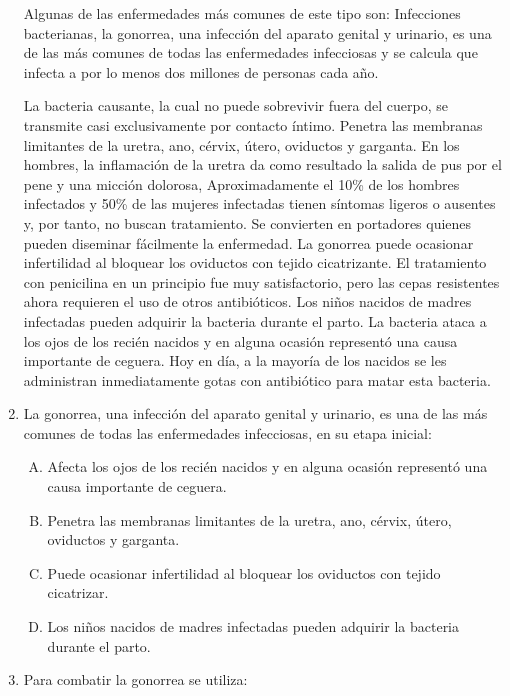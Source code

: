 \begin{enumerate}
Algunas de las enfermedades más comunes de este tipo son: 
Infecciones bacterianas, la gonorrea, una infección del aparato genital y urinario, es una de las más comunes de todas las enfermedades infecciosas y se calcula que infecta a por lo menos dos millones de personas cada año. 

La bacteria causante, la cual no puede sobrevivir fuera del cuerpo, se transmite casi exclusivamente por contacto íntimo. Penetra las membranas limitantes de la uretra, ano, cérvix, útero, oviductos y garganta. En los hombres, la inflamación de la uretra da como resultado la salida de pus por el pene y una micción dolorosa, Aproximadamente el 10\% de los hombres infectados y 50\% de las mujeres infectadas tienen síntomas ligeros o ausentes y, por tanto, no buscan tratamiento. Se convierten en portadores quienes pueden diseminar fácilmente la enfermedad. La gonorrea puede ocasionar infertilidad al bloquear los oviductos con tejido cicatrizante. El tratamiento con penicilina en un principio fue muy satisfactorio, pero las cepas resistentes ahora requieren el uso de otros antibióticos. Los niños nacidos de madres infectadas pueden adquirir la bacteria durante el parto. La bacteria ataca a los ojos de los recién nacidos y en alguna ocasión representó una causa importante de ceguera. Hoy en día, a la mayoría de los nacidos se les administran inmediatamente gotas con antibiótico para matar esta bacteria. 

\item La gonorrea, una infección del aparato genital y urinario, es una de las más comunes de todas las enfermedades infecciosas, en su etapa inicial: \label{bio-11}

\begin{enumerate}[(A)]
\item Afecta los ojos de los recién nacidos y en alguna ocasión representó una causa importante de ceguera. 
\item Penetra las membranas limitantes de la uretra, ano, cérvix, útero, oviductos y garganta.
\item Puede ocasionar infertilidad al bloquear los oviductos con tejido cicatrizar. 
\item Los niños nacidos de madres infectadas pueden adquirir la bacteria durante el parto. 
\end{enumerate}


\item Para combatir la gonorrea se utiliza: \label{bio-12}


\end{enumerate}
